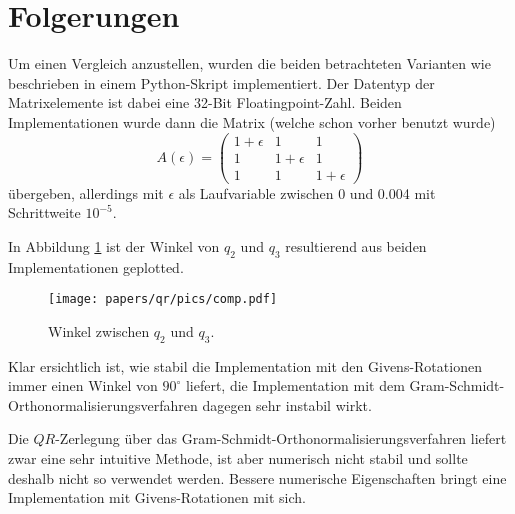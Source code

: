 %
%
%
\section{Folgerungen
\label{qr:section:folgerungen}}
Um einen Vergleich anzustellen, wurden die beiden betrachteten Varianten wie beschrieben in einem Python-Skript implementiert. 
%
Der Datentyp der Matrixelemente ist dabei eine 32-Bit Floatingpoint-Zahl.
Beiden Implementationen wurde dann die Matrix (welche schon vorher benutzt wurde)
\begin{equation*}
	A(\epsilon)=
	\begin{pmatrix}
	1+\epsilon&1&1\\
	1&1+\epsilon&1\\
	1&1&1+\epsilon
	\end{pmatrix}
\end{equation*}
übergeben, allerdings mit $\epsilon$ als Laufvariable zwischen 0 und 0.004 mit Schrittweite $10^{-5}$.

In Abbildung \ref{qr:comp} ist der Winkel von $q_2$ und $q_3$ resultierend aus beiden Implementationen geplotted.
\begin{figure}[ht]
	\centering
	\texttt{[image: papers/qr/pics/comp.pdf]}
	\caption{Winkel zwischen $q_2$ und $q_3$.\label{qr:comp}}
\end{figure}
Klar ersichtlich ist, wie stabil die Implementation mit den Givens-Rotationen immer einen Winkel von $90^\circ$ liefert, die Implementation mit dem Gram-Schmidt-Orthonormalisierungsverfahren dagegen sehr instabil wirkt.

Die $QR$-Zerlegung über das Gram-Schmidt-Orthonormalisierungsverfahren liefert zwar eine sehr intuitive Methode, ist aber numerisch nicht stabil und sollte deshalb nicht so verwendet werden.
Bessere numerische Eigenschaften bringt eine Implementation mit Givens-Rotationen mit sich.
